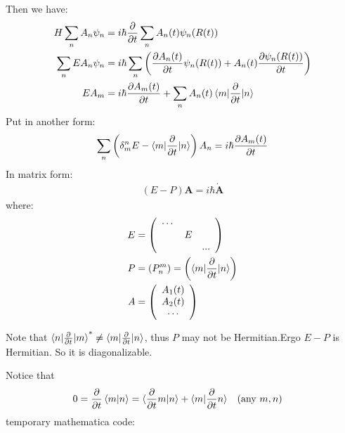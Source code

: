 \documentclass{article}
\begin{document}
    Then we have:
    \begin{align}
    H \sum_n A_n \psi_n &=i\hbar\frac{\partial }{\partial t}
	  	\sum_n A_n(t) \psi_n(R(t)) \nonumber\\
	\sum_n E A_n \psi_n&=i\hbar\sum_n
		\left(
		\frac{\partial A_n(t)}{\partial t}\psi_n(R(t))+
		A_n(t)\frac{\partial \psi_n(R(t))}{\partial t}
		\right) \nonumber\\
	E A_m &=i\hbar
		\frac{\partial A_m(t)}{\partial t}
		+\sum_n A_n(t)\braket{m|\frac{\partial }{\partial t}|n}
    \end{align}
    Put in another form:
    $$
    \sum_n \left(\delta^n_m E
        - \braket{m| \frac{\partial}{\partial t}|n} \right) A_n
        =
    i\hbar \frac{\partial A_m(t)}{\partial t}
    $$
    In matrix form:
    \begin{align}
            (E - P) \mathbf{A} = i\hbar \dot{\mathbf{A}}
    \end{align}
    where:
    \begin{align}
        E &= \left(
        \begin{array}{ccc}
         \cdots   &     &   \\
              & E &   \\
             &    & \text{...} \\
        \end{array}
        \right) \\
        P &= (P^m_n) = \left(
        \braket{m| \frac{\partial}{\partial t}|n}\right)\\
        A &= \left(\begin{array}{c}
            A_1(t) \\
            A_2(t) \\
            \cdots \\
        \end{array}\right)
    \end{align}
    
    Note that $\braket{n| \frac{\partial}{\partial t}|m}^* \neq
    \braket{m| \frac{\partial}{\partial t} |n}$, thus $P$ may not be
    Hermitian.Ergo $E-P$ is Hermitian. So it is diagonalizable.

    Notice that
    \begin{align}
            0= \frac{\partial}{\partial t} \braket{m|n} &=
        \braket{\frac{\partial}{\partial t}m|n} +
        \braket{m|\frac{\partial}{\partial t}n} &&(\text{any }m,n)
    \end{align}
    temporary mathematica code:
\end{document}
